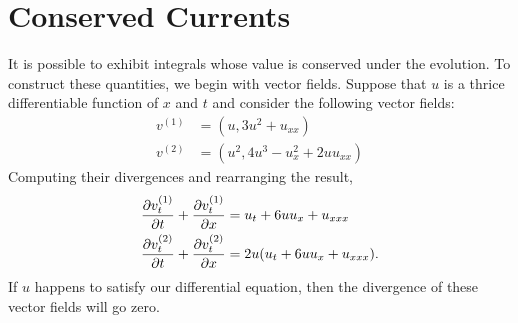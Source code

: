 \documentclass[12pt]{article}
\begin{document}
\section{Conserved Currents}

It is possible to exhibit integrals whose value is conserved under the
evolution.  To construct these quantities, we begin with vector fields.
Suppose that $u$ is a thrice differentiable function of $x$ and $t$ and
consider the following vector fields:
\begin{align*}
 v^{(1)} &= (u, 3 u^2 + u_{xx})  \\
 v^{(2)} &= (u^2, 4 u^3 - u_x^2 + 2 u u_{xx})
\end{align*}
Computing their divergences and rearranging the result,
\begin{align*}
 {\partial v^{(1)}_t \over \partial t} +
 {\partial v^{(1)}_t \over \partial x} &=
 u_{t} + 6 u u_x + u_{xxx} \\
 {\partial v^{(2)}_t \over \partial t} +
 {\partial v^{(2)}_t \over \partial x} &=
 2 u (u_t + 6 u u_x + u_{xxx}) .
\end{align*}
If $u$ happens to satisfy our differential equation, then the
divergence of these vector fields will go zero.
\end{document}
